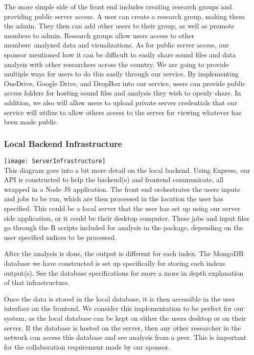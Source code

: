The more simple side of the front end includes creating research groups and providing public server access. A user can create a research group, making them the admin. They then can add other users to their group, as well as promote members to admin. Research groups allow users access to other members\textquotesingle\ analyzed data and visualizations. As for public server access, our sponsor mentioned how it can be difficult to easily share sound files and data analysis with other researchers across the country. We are going to provide multiple ways for users to do this easily through our service. By implementing OneDrive, Google Drive, and DropBox into our service, users can provide public access folders for hosting sound files and analysis they wish to openly share. In addition, we also will allow users to upload private server credentials that our service will utilize to allow others access to the server for viewing whatever has been made public.

\subsubsection{Local Backend Infrastructure}
\texttt{[image: ServerInfrastructure]} \\
This diagram goes into a bit more detail on the local backend. Using Express, our API is constructed to help the backend(s) and frontend communicate, all wrapped in a Node JS application. The front end orchestrates the user\textquotesingle s inputs and jobs to be run, which are then processed in the location the user has specified. This could be a local server that the user has set up using our server side application, or it could be their desktop computer. These jobs and input files go through the R scripts included for analysis in the  package, depending on the user specified indices to be processed.\par
After the analysis is done, the output is different for each index. The MongoDB database we have constructed is set up specifically for storing each index\textquotesingle s output(s). See the database specifications for more a more in depth explanation of that infrastructure.\par
Once the data is stored in the local database, it is then accessible in the user interface on the frontend. We consider this implementation to be perfect for our system, as the local database can be kept on either the user\textquotesingle s desktop or on their server. If the database is hosted on the server, then any other researcher in the network can access this database and see analysis from a peer. This is important for the collaboration requirement made by our sponsor.

